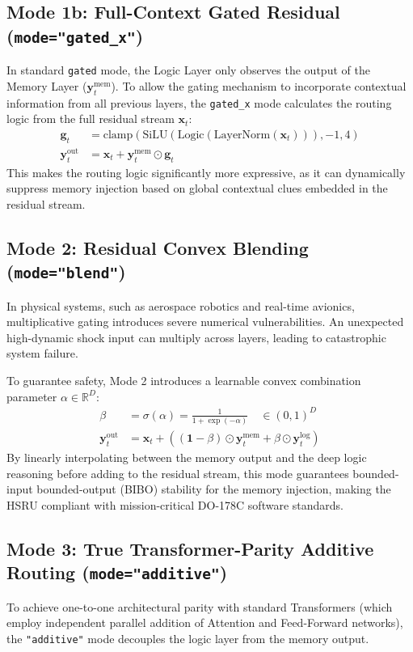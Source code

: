 \documentclass[11pt,a4paper]{article}
\begin{document}
\subsection{Mode 1b: Full-Context Gated Residual (\texttt{mode="gated\_x"})}
In standard \texttt{gated} mode, the Logic Layer only observes the output of the Memory Layer ($\mathbf{y}_t^{\text{mem}}$). To allow the gating mechanism to incorporate contextual information from all previous layers, the \texttt{gated\_x} mode calculates the routing logic from the full residual stream $\mathbf{x}_t$:
\begin{align}
    \mathbf{g}_t &= \text{clamp}\left( \text{SiLU}(\text{Logic}(\text{LayerNorm}(\mathbf{x}_t))), -1, 4 \right) \\
    \mathbf{y}_t^{\text{out}} &= \mathbf{x}_t + \mathbf{y}_t^{\text{mem}} \odot \mathbf{g}_t
\end{align}
This makes the routing logic significantly more expressive, as it can dynamically suppress memory injection based on global contextual clues embedded in the residual stream.

\subsection{Mode 2: Residual Convex Blending (\texttt{mode="blend"})}
In physical systems, such as aerospace robotics and real-time avionics, multiplicative gating introduces severe numerical vulnerabilities. An unexpected high-dynamic shock input can multiply across layers, leading to catastrophic system failure. 

To guarantee safety, Mode 2 introduces a learnable convex combination parameter $\alpha \in \mathbb{R}^D$:
\begin{align}
    \beta &= \sigma(\alpha) = \frac{1}{1 + \exp(-\alpha)} \quad \in (0, 1)^D \\
    \mathbf{y}_t^{\text{out}} &= \mathbf{x}_t + \left( (\mathbf{1} - \beta) \odot \mathbf{y}_t^{\text{mem}} + \beta \odot \mathbf{y}_t^{\text{log}} \right)
\end{align}
By linearly interpolating between the memory output and the deep logic reasoning before adding to the residual stream, this mode guarantees bounded-input bounded-output (BIBO) stability for the memory injection, making the HSRU compliant with mission-critical DO-178C software standards.

\subsection{Mode 3: True Transformer-Parity Additive Routing (\texttt{mode="additive"})}
To achieve one-to-one architectural parity with standard Transformers (which employ independent parallel addition of Attention and Feed-Forward networks), the \texttt{"additive"} mode decouples the logic layer from the memory output. 
\end{document}
